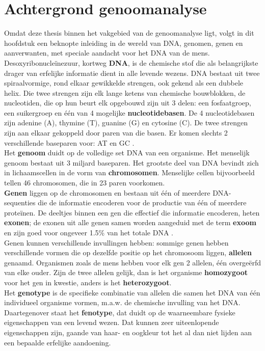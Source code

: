 \chapter{Achtergrond genoomanalyse}
\label{dna_dummies}

Omdat deze thesis binnen het vakgebied van de genoomanalyse ligt, volgt in dit hoofdstuk een beknopte inleiding in de wereld van DNA, genomen, genen en aanverwanten, met speciale aandacht voor het DNA van de mens.\\

Desoxyribonucle\"inezuur, kortweg \textbf{DNA}, is de chemische stof die als belangrijkste drager van erfelijke informatie dient in alle levende wezens. DNA bestaat uit twee spiraalvormige, rond elkaar gewikkelde strengen, ook gekend als een dubbele helix. Die twee strengen zijn elk lange ketens van chemische bouwblokken, de nucleotiden, die op hun beurt elk opgebouwd zijn uit 3 delen: een fosfaatgroep, een suikergroep en \'e\'en van 4 mogelijke \textbf{nucleotidebasen}. De 4 nucleotidebasen zijn adenine (A), thymine (T), guanine (G) en cytosine (C). De twee strengen zijn aan elkaar gekoppeld door paren van die basen. Er komen slechts 2 verschillende baseparen voor: AT en GC \cite{genome_gov} \cite{nature_scitable}.\\

Het \textbf{genoom} duidt op de volledige set DNA van een organisme. Het menselijk genoom bestaat uit 3 miljard baseparen. Het grootste deel van DNA bevindt zich in lichaamscellen in de vorm van \textbf{chromosomen}. Menselijke cellen bijvoorbeeld tellen 46 chromosomen, die in 23 paren voorkomen.\\
\textbf{Genen} liggen op de chromosomen en bestaan uit \'e\'en of meerdere DNA-sequenties die de informatie encoderen voor de productie van \'e\'en of meerdere prote\"inen. De deeltjes binnen een gen die effectief die informatie encoderen, heten \textbf{exonen}; de exonen uit alle genen samen worden aangeduid met de term \textbf{exoom} en zijn goed voor ongeveer 1.5\% van het totale DNA \cite{broad_exome}.\\
Genen kunnen verschillende invullingen hebben: sommige genen hebben verschillende vormen die op dezelfde positie op het chromosoom liggen, \textbf{allelen} genaamd. Organismen zoals de mens hebben voor elk gen 2 allelen, \'e\'en overge\"erfd van elke ouder. Zijn de twee allelen gelijk, dan is het organisme \textbf{homozygoot} voor het gen in kwestie, anders is het \textbf{heterozygoot}.\\
Het \textbf{genotype} is de specifieke combinatie van allelen die samen het DNA van \'e\'en individueel organisme vormen, m.a.w. de chemische invulling van het DNA. Daartegenover staat het \textbf{fenotype}, dat duidt op de waarneembare fysieke eigenschappen van een levend wezen. Dat kunnen zeer uiteenlopende eigenschappen zijn, gaande van haar- en oogkleur tot het al dan niet lijden aan een bepaalde erfelijke aandoening.\\


